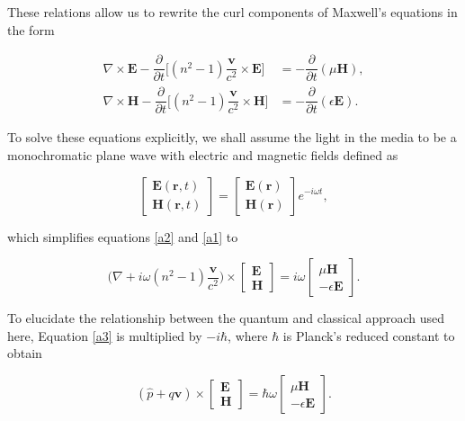 These relations allow us to rewrite the curl components of Maxwell's equations in the form

\begin{align}
\nabla \times \bm{E}  -\dfrac{\partial}{\partial t} \Big[(n^2 - 1) \dfrac{\bm{v}}{c^2} \times \bm{E}\Big] &=-\dfrac{\partial}{\partial t}(\mu\bm{H}), \label{a2}\\
\nabla \times \bm{H}  -\dfrac{\partial}{\partial t} \Big[(n^2 - 1) \dfrac{\bm{v}}{c^2} \times \bm{H}\Big] &=-\dfrac{\partial}{\partial t}(\epsilon\bm{E}). \label{a1}
\end{align}

To solve these equations explicitly, we shall assume the light in the media to be a monochromatic plane wave with electric and magnetic fields defined as 

\begin{equation}
\begin{bmatrix}
\bm{E}(\bm{r},t) \\
\bm{H}(\bm{r},t)
\end{bmatrix}
=
\begin{bmatrix}
\bm{E}(\bm{r}) \\
\bm{H}(\bm{r}) 
\end{bmatrix}
e^{-i \omega t},
\label{eqn:planewave}
\end{equation}

which simplifies equations \ref{a2} and \ref{a1} to

\begin{equation}
\Big(\nabla + i \omega (n^2 - 1) \dfrac{\boldsymbol{v}}{c^2}\Big) \times 
\begin{bmatrix}
\bm{E} \\
\bm{H}
\end{bmatrix}
=
i\omega
\begin{bmatrix}
\mu \bm{H} \\
-\epsilon \bm{E}
\end{bmatrix}.
\label{a3}
\end{equation}

To elucidate the relationship between the quantum and classical approach used here, Equation \ref{a3} is multiplied by $-i \hbar$, where $\hbar$ is Planck's reduced constant to obtain

\begin{equation}
(\hat{p} + q \bm{v} ) \times 
\begin{bmatrix}
\bm{E} \\
\bm{H}
\end{bmatrix} 
= 
\hbar \omega
\begin{bmatrix}
\mu \bm{H} \\
-\epsilon \bm{E}
\end{bmatrix} .
\label{eqn:finalfield}
\end{equation}

